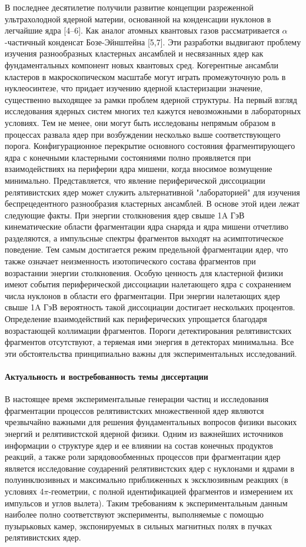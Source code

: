 \documentclass[fontsize=14pt]{scrarticle}
\begin{document}
    В последнее десятилетие получили развитие концепции разреженной ультрахолодной ядерной материи, основанной на конденсации нуклонов в легчайшие ядра [4–6]. Как аналог атомных квантовых газов рассматривается $\alpha$-частичный конденсат Бозе-Эйнштейна [5,7]. Эти разработки выдвигают проблему изучения разнообразных кластерных ансамблей и несвязанных ядер как фундаментальных компонент новых квантовых сред. Когерентные ансамбли кластеров в макроскопическом масштабе могут играть промежуточную роль в нуклеосинтезе, что придает изучению ядерной кластеризации значение, существенно выходящее за рамки проблем ядерной структуры. На первый взгляд исследования ядерных систем многих тел кажутся невозможными в лабораторных условиях. Тем не менее, они могут быть исследованы непрямым образом в процессах развала ядер при возбуждении несколько выше соответствующего порога. Конфигурационное перекрытие основного состояния фрагментирующего ядра с конечными кластерными состояниями полно проявляется при взаимодействиях на периферии ядра мишени, когда вносимое возмущение минимально. Представляется, что явление периферической диссоциации релятивистских ядер может служить альтернативной "лабораторией" для изучения беспрецедентного разнообразия кластерных ансамблей. В основе этой идеи лежат следующие факты. При энергии столкновения ядер свыше 1A ГэВ кинематические области фрагментации ядра снаряда и ядра мишени отчетливо разделяются, а импульсные спектры фрагментов выходят на асимптотическое поведение. Тем самым достигается режим предельной фрагментации ядер, что также означает неизменность изотопического состава фрагментов при возрастании энергии столкновения. Особую ценность для кластерной физики имеют события периферической диссоциации налетающего ядра с сохранением числа нуклонов в области его фрагментации. При энергии налетающих ядер свыше 1A ГэВ вероятность такой диссоциации достигает нескольких процентов. Определение взаимодействий как периферических упрощается благодаря возрастающей коллимации фрагментов. Пороги детектирования релятивистских фрагментов отсутствуют, а теряемая ими энергия в детекторах минимальна. Все эти обстоятельства принципиально важны для экспериментальных исследований.
    \paragraph{Актуальность и востребованность темы диссертации} В настоящее время экспериментальные генерации частиц и исследования
    фрагментации процессов релятивистских множественной ядер являются
    чрезвычайно важными для решения фундаментальных вопросов физики
    высоких энергий и релятивистской ядерной физики. Одним из важнейших источников информации о структуре ядер и ее влиянии на состав конечных продуктов реакций, а также роли зарядовообменных процессов при фрагментации ядер является исследование соударений релятивистских ядер с нуклонами и ядрами в полуинклюзивных и максимально приближенных к эксклюзивным реакциях (в условиях 4$\pi$-геометрии, с полной идентификацией фрагментов и измерением их импульсов и углов вылета). Таким требованиям к экспериментальным данным наиболее полно соответствуют эксперименты, выполняемые с помощью пузырьковых камер, экспонируемых в сильных магнитных полях в пучках релятивистских ядер.
\end{document}
